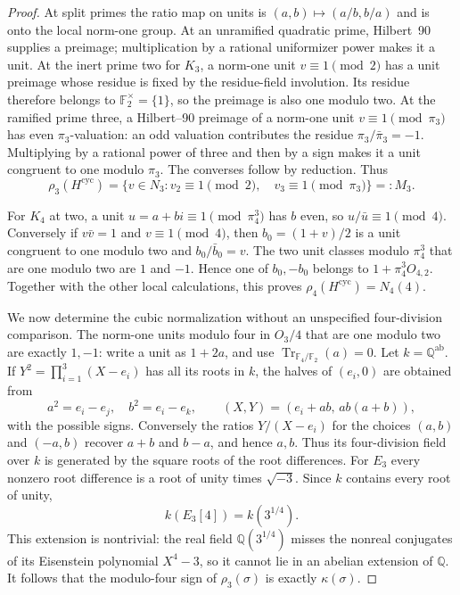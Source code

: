 \begin{proof}
At split primes the ratio map on units is
$(a,b)\mapsto(a/b,b/a)$ and is onto the local norm-one group.
At an unramified quadratic prime, Hilbert~90 supplies a preimage;
multiplication by a rational uniformizer power makes it a unit.
At the inert prime two for $K_3$, a norm-one unit $v\equiv1\pmod2$
has a unit preimage whose residue is fixed by the residue-field
involution.  Its residue therefore belongs to
$\mathbb F_2^\times=\{1\}$, so the preimage is also one modulo two.
At the ramified prime three, a Hilbert--90 preimage of a norm-one
unit $v\equiv1\pmod{\pi_3}$ has even $\pi_3$-valuation:
an odd valuation contributes the residue
$\pi_3/\bar\pi_3=-1$.  Multiplying by a rational power of three
and then by a sign makes it a unit congruent to one modulo $\pi_3$.
The converses follow by reduction.  Thus
\begin{equation}
 \rho_3(H^{\mathrm{cyc}})
 =\{v\in N_3:v_2\equiv1\pmod2,\quad
                     v_3\equiv1\pmod{\pi_3}\}=:M_3.
 \label{eq:adelic-unnormalized-cubic-image}
\end{equation}

For $K_4$ at two, a unit $u=a+bi\equiv1\pmod{\pi_4^3}$ has
$b$ even, so $u/\bar u\equiv1\pmod4$.  Conversely if
$v\bar v=1$ and $v\equiv1\pmod4$, then
$b_0=(1+v)/2$ is a unit congruent to one modulo two and
$b_0/\bar b_0=v$.  The two unit classes modulo $\pi_4^3$ that
are one modulo two are $1$ and $-1$.  Hence one of $b_0,-b_0$
belongs to $1+\pi_4^3O_{4,2}$.  Together with the other local
calculations, this proves $\rho_4(H^{\mathrm{cyc}})=N_4(4)$.

We now determine the cubic normalization without an unspecified
four-division comparison.  The norm-one units modulo four in
$O_3/4$ that are one modulo two are exactly $1,-1$:
write a unit as $1+2a$, and use
$\operatorname{Tr}_{\mathbb F_4/\mathbb F_2}(a)=0$.
Let $k=\mathbb Q^{\mathrm{ab}}$.  If
$Y^2=\prod_{i=1}^3(X-e_i)$ has all its roots in $k$, the halves
of $(e_i,0)$ are obtained from
\[
 a^2=e_i-e_j,\quad b^2=e_i-e_k,\qquad
 (X,Y)=(e_i+ab,\,ab(a+b)),
\]
with the possible signs.  Conversely the ratios $Y/(X-e_i)$
for the choices $(a,b)$ and $(-a,b)$ recover $a+b$ and $b-a$,
and hence $a,b$.  Thus its four-division field over $k$ is
generated by the square roots of the root differences.
For $E_3$ every nonzero root difference is a root of unity times
$\sqrt{-3}$.  Since $k$ contains every root of unity,
\begin{equation}
 k(E_3[4])=k(3^{1/4}).
 \label{eq:adelic-cubic-four-division}
\end{equation}
This extension is nontrivial: the real field
$\mathbb Q(3^{1/4})$ misses the nonreal conjugates of its
Eisenstein polynomial $X^4-3$, so it cannot lie in an abelian
extension of $\mathbb Q$.
It follows that the modulo-four sign of $\rho_3(\sigma)$ is
exactly $\kappa(\sigma)$.


\end{proof}
